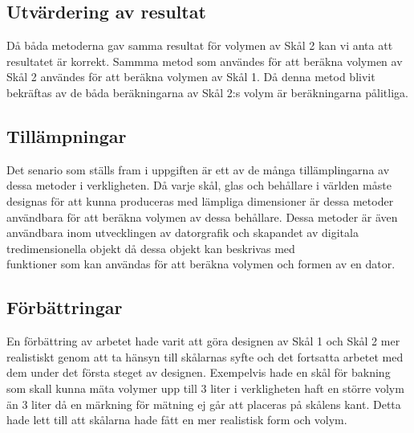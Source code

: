 \documentclass[12pt]{article}
\begin{document}
\subsection*{Utvärdering av resultat}
Då båda metoderna gav samma resultat för volymen av Skål 2 kan vi anta att resultatet är korrekt. Sammma metod som användes för att beräkna volymen av Skål 2 användes för att beräkna volymen av Skål 1. Då denna metod blivit bekräftas av de båda beräkningarna av Skål 2:s volym är beräkningarna pålitliga.

\subsection*{Tillämpningar}
Det senario som ställs fram i uppgiften är ett av de många tillämplingarna av dessa metoder i verkligheten. Då varje skål, glas och behållare i världen måste designas för att kunna produceras med lämpliga dimensioner är dessa metoder användbara för att beräkna volymen av dessa behållare. Dessa metoder är även användbara inom utvecklingen av datorgrafik och skapandet av digitala tredimensionella objekt då dessa objekt kan beskrivas med\\ funktioner som kan användas för att beräkna volymen och formen av en dator.

\subsection*{Förbättringar}
En förbättring av arbetet hade varit att göra designen av Skål 1 och Skål 2 mer realistiskt genom att ta hänsyn till skålarnas syfte och det fortsatta arbetet med dem under det första steget av designen. Exempelvis hade en skål för bakning som skall kunna mäta volymer upp till 3 liter i verkligheten haft en större volym än 3 liter då en märkning för mätning ej går att placeras på skålens kant. Detta hade lett till att skålarna hade fått en mer realistisk form och volym.
\end{document}
